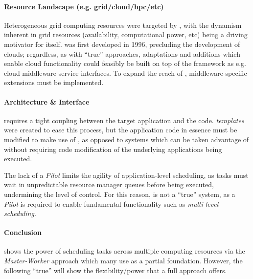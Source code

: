 \documentclass{sig-alternate}
\begin{document}
\paragraph{Resource Landscape (e.g. grid/cloud/hpc/etc)}
Heterogeneous grid computing resources were targeted by
\apples, with the dynamism inherent in grid resources (availability,
computational power, etc) being a driving 
motivator for \apples itself.  \apples
was first developed in 1996, precluding the development of clouds;
regardless, as with ``true'' \pilotjob approaches, adaptations
and additions which enable cloud functionality could
feasibly be built on top of the \apples framework as e.g.
cloud middleware service interfaces.
 To expand the reach of \apples, middleware-specific
extensions must be implemented.

\paragraph{Architecture \& Interface}
\apples requires a tight coupling between the target application
and the \apples code.  \textit{\apples templates} were created
to ease this process, but the application code in essence must
be modified to make use of \apples, as opposed to \pilotjob
systems which can  be taken advantage of without
requiring code modification of the underlying applications being
executed.

The lack of a \textit{Pilot} limits the agility
of application-level scheduling, as tasks
must wait in unpredictable resource manager queues before being executed,
undermining the level of control.  For this reason, \apples
is not a ``true'' \pilotjob system, as a \textit{Pilot}
is required to enable fundamental \pilotjob functionality such as
\textit{multi-level scheduling}.

\paragraph{\apples Conclusion}
\apples shows the power of scheduling tasks across multiple computing resources
via the \textit{Master-Worker} approach  which many
\pilotjobs use as a partial foundation.  However,
the following ``true'' \pilotjobs will show the flexibility/power
that a full \pilotjob approach offers.

\end{document}
